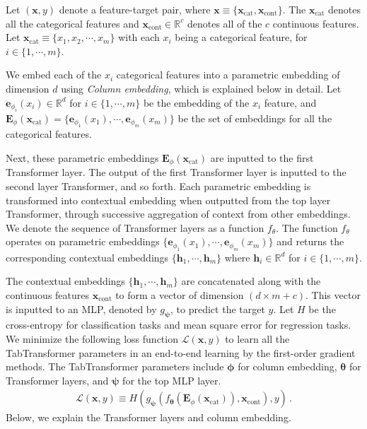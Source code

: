 Let $(\bm{x}, y)$ denote a feature-target pair,  where $\bm{x} \equiv \{\bm{x}_{\text{cat}}, \bm{x}_{\text{cont}}\}$. The $\bm{x}_{\text{cat}}$ denotes all the categorical features and $\bm{x}_{\text{cont}} \in \mathbb{R}^{c}$ denotes all of the $c$ continuous features. Let $\bm{x}_{\text{cat}} \equiv \{x_1, x_2, \cdots, x_m\}$ with each $x_i$ being a categorical feature, for $i \in \{1,\cdots, m\}$. 

We embed each of the $x_i$ categorical features into a parametric embedding of dimension $d$ using \textit{Column embedding}, which is explained below in detail. Let $\bm{e}_{{\phi}_i}(x_i) \in \mathbb{R}^d$ for $i \in \{1,\cdots,m\}$ be the embedding of the $x_i$ feature, and $\bm{E}_{\phi}(\bm{x}_{\text{cat}}) = \{\bm{e}_{{\phi}_1}(x_1),\cdots,  \bm{e}_{{\phi}_m}(x_m)\}$ be the set of embeddings for all the categorical features. 

Next, these parametric embeddings $\bm{E}_{\phi}(\bm{x}_{\text{cat}})$ are inputted to the first Transformer layer. The output of the first Transformer layer is inputted to the second layer Transformer, and so forth.
Each parametric embedding is transformed into contextual embedding when outputted from the top layer Transformer, through successive aggregation of context from other embeddings. We denote the sequence of Transformer layers as a function $f_{\theta}$. The function $f_{\theta}$ operates on parametric embeddings $\{\bm{e}_{{\phi}_1}(x_1),\cdots, \bm{e}_{{\phi}_m}(x_m)\}$ and returns the corresponding contextual embeddings $\{\bm{h}_1,\cdots, \bm{h}_m\}$ where $\bm{h}_i\in \mathbb{R}^d$ for $i \in \{1,\cdots, m\}$.

The contextual embeddings $\{\bm{h}_1,\cdots, \bm{h}_m\}$ are concatenated along with the continuous features $\bm{x}_{\text{cont}}$ to form a vector of dimension $(d\times m + c)$. This vector is inputted to an MLP, denoted by $g_{\bm{\psi}}$, to predict the target $y$. Let $H$ be the cross-entropy for classification tasks and mean square error for regression tasks. We minimize the following loss function $\mathcal{L}(\bm{x}, y)$ to learn all the TabTransformer parameters in an end-to-end learning by the first-order gradient methods. The TabTransformer parameters include $\bm{\phi}$ for column embedding, $\bm{\theta}$ for Transformer layers, and $\bm{\psi}$ for the top MLP layer.
\begin{align}
\label{equaton: supervised-loss}
\mathcal{L}(\bm{x}, y) \equiv H( g_{\bm{\psi}}(f_{\bm{\bm{\theta}
}}(\bm{E}_{\phi}(\bm{x}_{\text{cat}})), \bm{x}_{\text{cont}}), y)\,.
\end{align}
Below, we explain the Transformer layers and column embedding.

